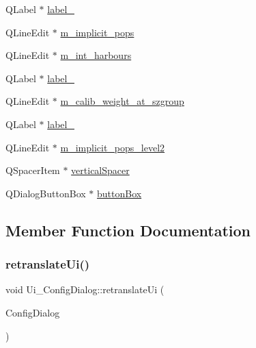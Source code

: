 \begin{DoxyCompactItemize}
\item 
Q\+Label $\ast$ \mbox{\hyperlink{class_ui___config_dialog_ad12abe00305db381515e7749074e85e0}{label\+\_}}
\item 
Q\+Line\+Edit $\ast$ \mbox{\hyperlink{class_ui___config_dialog_a9e55cad22a0875aa6253d568d60d8661}{m\+\_\+implicit\+\_\+pops}}
\item 
Q\+Line\+Edit $\ast$ \mbox{\hyperlink{class_ui___config_dialog_a6584a941c309e3c9510e45544b1212da}{m\+\_\+int\+\_\+harbours}}
\item 
Q\+Label $\ast$ \mbox{\hyperlink{class_ui___config_dialog_ac2bf9606cbbde9d7e178242d5d66c11b}{label\+\_}}
\item 
Q\+Line\+Edit $\ast$ \mbox{\hyperlink{class_ui___config_dialog_afca8c0dbb8a5d11b9926a3205cdb2fc2}{m\+\_\+calib\+\_\+weight\+\_\+at\+\_\+szgroup}}
\item 
Q\+Label $\ast$ \mbox{\hyperlink{class_ui___config_dialog_a58aaeb116acf3cb61463bd57def02d31}{label\+\_}}
\item 
Q\+Line\+Edit $\ast$ \mbox{\hyperlink{class_ui___config_dialog_ad95d2aad8f66985ebb78501d4f47a2f7}{m\+\_\+implicit\+\_\+pops\+\_\+level2}}
\item 
Q\+Spacer\+Item $\ast$ \mbox{\hyperlink{class_ui___config_dialog_ac409e2fd88b71f3aaa6de087b3f5eb94}{vertical\+Spacer}}
\item 
Q\+Dialog\+Button\+Box $\ast$ \mbox{\hyperlink{class_ui___config_dialog_a35f90058a76519163267d4bdbf464306}{button\+Box}}
\end{DoxyCompactItemize}


\subsection{Member Function Documentation}
\mbox{\label{class_ui___config_dialog_ab60d649af45498dee23f4e61fcfe94d8}} 
\subsubsection{\texorpdfstring{retranslateUi()}{retranslateUi()}}
{\footnotesize\ttfamily void Ui\+\_\+\+Config\+Dialog\+::retranslate\+Ui (\begin{DoxyParamCaption}\item[{Q\+Dialog $\ast$}]{Config\+Dialog }\end{DoxyParamCaption})\hspace{0.3cm}{\ttfamily [inline]}}


